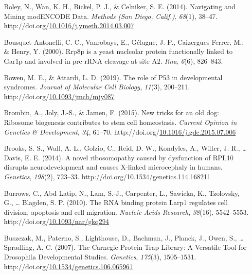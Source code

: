 \documentclass[12pt,oneside]{reedthesis}
\newlength{\cslhangindent}
\newenvironment{CSLReferences}[2] %
 {%
  \setlength{\parindent}{0pt}
  \ifodd #1 \everypar{\setlength{\hangindent}{\cslhangindent}}\ignorespaces\fi
  \ifnum #2 > 0
  \setlength{\parskip}{#2\baselineskip}
  \fi
 }%
 {}
\begin{document}
\begin{CSLReferences}{1}{0}
\leavevmode{}%
Boley, N., Wan, K. H., Bickel, P. J., \& Celniker, S. E. (2014). Navigating and {Mining modENCODE Data}. \emph{Methods (San Diego, Calif.)}, \emph{68}(1), 38--47. http://doi.org/\href{https://doi.org/10.1016/j.ymeth.2014.03.007}{10.1016/j.ymeth.2014.03.007}

\leavevmode{}%
Bousquet-Antonelli, C. C., Vanrobays, E., Gélugne, J.-P., Caizergues-Ferrer, M., \& Henry, Y. (2000). Rrp8p is a yeast nucleolar protein functionally linked to {Gar1p} and involved in pre-{rRNA} cleavage at site {A2}. \emph{Rna}, \emph{6}(6), 826--843.

\leavevmode{}%
Bowen, M. E., \& Attardi, L. D. (2019). The role of P53 in developmental syndromes. \emph{Journal of Molecular Cell Biology}, \emph{11}(3), 200--211. http://doi.org/\href{https://doi.org/10.1093/jmcb/mjy087}{10.1093/jmcb/mjy087}

\leavevmode{}%
Brombin, A., Joly, J.-S., \& Jamen, F. (2015). New tricks for an old dog: Ribosome biogenesis contributes to stem cell homeostasis. \emph{Current Opinion in Genetics \& Development}, \emph{34}, 61--70. http://doi.org/\href{https://doi.org/10.1016/j.gde.2015.07.006}{10.1016/j.gde.2015.07.006}

\leavevmode{}%
Brooks, S. S., Wall, A. L., Golzio, C., Reid, D. W., Kondyles, A., Willer, J. R., \ldots{} Davis, E. E. (2014). A novel ribosomopathy caused by dysfunction of {RPL10} disrupts neurodevelopment and causes {X-linked} microcephaly in humans. \emph{Genetics}, \emph{198}(2), 723--33. http://doi.org/\href{https://doi.org/10.1534/genetics.114.168211}{10.1534/genetics.114.168211}

\leavevmode{}%
Burrows, C., Abd Latip, N., Lam, S.-J., Carpenter, L., Sawicka, K., Tzolovsky, G., \ldots{} Blagden, S. P. (2010). The {RNA} binding protein {Larp1} regulates cell division, apoptosis and cell migration. \emph{Nucleic Acids Research}, \emph{38}(16), 5542--5553. http://doi.org/\href{https://doi.org/10.1093/nar/gkq294}{10.1093/nar/gkq294}

\leavevmode{}%
Buszczak, M., Paterno, S., Lighthouse, D., Bachman, J., Planck, J., Owen, S., \ldots{} Spradling, A. C. (2007). The {Carnegie Protein Trap Library}: {A Versatile Tool} for {Drosophila Developmental Studies}. \emph{Genetics}, \emph{175}(3), 1505--1531. http://doi.org/\href{https://doi.org/10.1534/genetics.106.065961}{10.1534/genetics.106.065961}


\end{CSLReferences}
\end{document}
